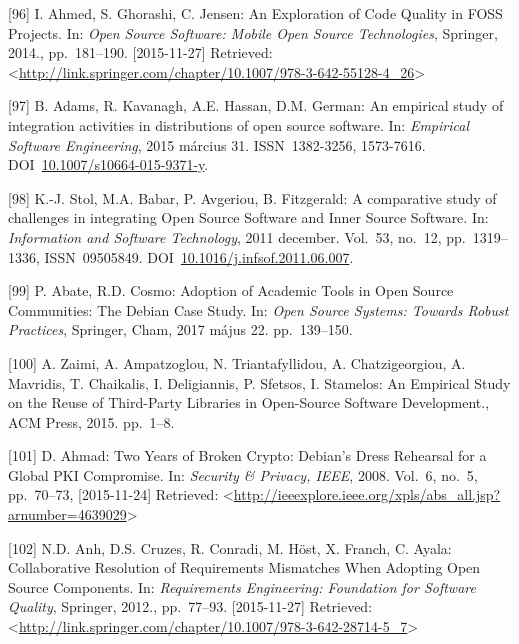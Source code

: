 \documentclass[12pt,magyar,a4paper,oneside]{scrreprt}
\begin{document}
\leavevmode\hypertarget{ref-ahmed_exploration_2014}{}%
{[}96{]} I. Ahmed, S. Ghorashi, C. Jensen: An Exploration of Code
Quality in FOSS Projects. In: \emph{Open Source Software: Mobile Open
Source Technologies}, Springer, 2014., pp.~181--190. {[}2015-11-27{]}
Retrieved:
\textless{}\url{http://link.springer.com/chapter/10.1007/978-3-642-55128-4_26}\textgreater{}

\leavevmode\hypertarget{ref-adams_empirical_2015}{}%
{[}97{]} B. Adams, R. Kavanagh, A.E. Hassan, D.M. German: An empirical
study of integration activities in distributions of open source
software. In: \emph{Empirical Software Engineering}, 2015 március 31.
ISSN~1382-3256, 1573-7616.
DOI~\href{https://doi.org/10.1007/s10664-015-9371-y}{10.1007/s10664-015-9371-y}.

\leavevmode\hypertarget{ref-stol_comparative_2011}{}%
{[}98{]} K.-J. Stol, M.A. Babar, P. Avgeriou, B. Fitzgerald: A
comparative study of challenges in integrating Open Source Software and
Inner Source Software. In: \emph{Information and Software Technology},
2011 december. Vol.~53, no.~12, pp.~1319--1336, ISSN~09505849.
DOI~\href{https://doi.org/10.1016/j.infsof.2011.06.007}{10.1016/j.infsof.2011.06.007}.

\leavevmode\hypertarget{ref-abate_adoption_2017}{}%
{[}99{]} P. Abate, R.D. Cosmo: Adoption of Academic Tools in Open Source
Communities: The Debian Case Study. In: \emph{Open Source Systems:
Towards Robust Practices}, Springer, Cham, 2017 május 22. pp.~139--150.

\leavevmode\hypertarget{ref-zaimi_empirical_2015}{}%
{[}100{]} A. Zaimi, A. Ampatzoglou, N. Triantafyllidou, A.
Chatzigeorgiou, A. Mavridis, T. Chaikalis, I. Deligiannis, P. Sfetsos,
I. Stamelos: An Empirical Study on the Reuse of Third-Party Libraries in
Open-Source Software Development., ACM Press, 2015. pp.~1--8.

\leavevmode\hypertarget{ref-ahmad_two_2008}{}%
{[}101{]} D. Ahmad: Two Years of Broken Crypto: Debian's Dress Rehearsal
for a Global PKI Compromise. In: \emph{Security \& Privacy, IEEE}, 2008.
Vol.~6, no.~5, pp.~70--73, {[}2015-11-24{]} Retrieved:
\textless{}\url{http://ieeexplore.ieee.org/xpls/abs_all.jsp?arnumber=4639029}\textgreater{}

\leavevmode\hypertarget{ref-anh_collaborative_2012}{}%
{[}102{]} N.D. Anh, D.S. Cruzes, R. Conradi, M. Höst, X. Franch, C.
Ayala: Collaborative Resolution of Requirements Mismatches When Adopting
Open Source Components. In: \emph{Requirements Engineering: Foundation
for Software Quality}, Springer, 2012., pp.~77--93. {[}2015-11-27{]}
Retrieved:
\textless{}\url{http://link.springer.com/chapter/10.1007/978-3-642-28714-5_7}\textgreater{}
\end{document}
